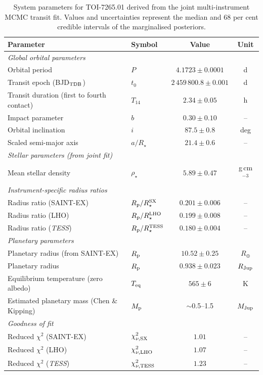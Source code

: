 \documentclass[fleqn,usenatbib]{mnras}
\newcommand{\Mjup}{M_{\rm Jup}}
\newcommand{\Rjup}{R_{\rm Jup}}
\newcommand{\Rearth}{R_{\oplus}}
\newcommand{\rhostar}{\rho_{\star}}
\newcommand{\rprs}{R_{\rm p}/R_{\star}}
\newcommand{\SAINTEX}{SAINT-EX}
\begin{document}
\begin{table}
  \caption{System parameters for TOI-7265.01 derived from the joint multi-instrument MCMC transit fit. Values and uncertainties represent the median and 68 per cent credible intervals of the marginalised posteriors.}
  \label{tab:results}
  \begin{tabular}{llcc}
    \toprule
    Parameter & Symbol & Value & Unit \\
    \midrule
    \multicolumn{4}{l}{\textit{Global orbital parameters}} \\
    Orbital period & $P$ & $4.1723 \pm 0.0001$ & d \\
    Transit epoch (BJD$_{\rm TDB}$) & $t_0$ & $2\,459\,800.8 \pm 0.001$ & d \\
    Transit duration (first to fourth contact) & $T_{14}$ & $2.34 \pm 0.05$ & h \\
    Impact parameter & $b$ & $0.30 \pm 0.10$ & -- \\
    Orbital inclination & $i$ & $87.5 \pm 0.8$ & deg \\
    Scaled semi-major axis & $a/R_{\star}$ & $21.4 \pm 0.6$ & -- \\
    \midrule
    \multicolumn{4}{l}{\textit{Stellar parameters (from joint fit)}} \\
    Mean stellar density & $\rhostar$ & $5.89 \pm 0.47$ & g\,cm$^{-3}$ \\
    \midrule
    \multicolumn{4}{l}{\textit{Instrument-specific radius ratios}} \\
    Radius ratio (\SAINTEX{}) & $\rprs^{\rm SX}$ & $0.201 \pm 0.006$ & -- \\
    Radius ratio (LHO) & $\rprs^{\rm LHO}$ & $0.199 \pm 0.008$ & -- \\
    Radius ratio (\textit{TESS}) & $\rprs^{\rm TESS}$ & $0.180 \pm 0.004$ & -- \\
    \midrule
    \multicolumn{4}{l}{\textit{Planetary parameters}} \\
    Planetary radius (from \SAINTEX{}) & $R_{\rm p}$ & $10.52 \pm 0.25$ & $\Rearth$ \\
    Planetary radius & $R_{\rm p}$ & $0.938 \pm 0.023$ & $\Rjup$ \\
    Equilibrium temperature (zero albedo) & $T_{\rm eq}$ & $565 \pm 6$ & K \\
    Estimated planetary mass (Chen \& Kipping) & $M_{\rm p}$ & $\sim$0.5--1.5 & $\Mjup$ \\
    \midrule
    \multicolumn{4}{l}{\textit{Goodness of fit}} \\
    Reduced $\chi^2$ (\SAINTEX{}) & $\chi^2_{\nu,{\rm SX}}$ & $1.01$ & -- \\
    Reduced $\chi^2$ (LHO) & $\chi^2_{\nu,{\rm LHO}}$ & $1.07$ & -- \\
    Reduced $\chi^2$ (\textit{TESS}) & $\chi^2_{\nu,{\rm TESS}}$ & $1.23$ & -- \\
    \bottomrule
  \end{tabular}
\end{table}
\end{document}
